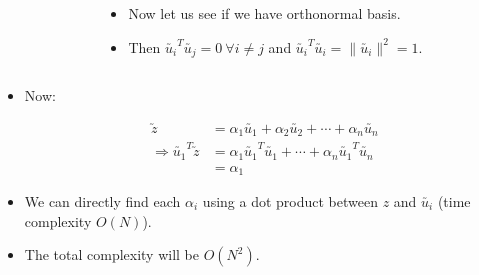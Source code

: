 \documentclass[10pt, aspectratio=169]{beamer}
\begin{document}
\begin{frame}
  \begin{columns}

    \begin{column}{0.5\textwidth}
      \centering
    \end{column}

    \begin{column}{0.5\textwidth}
      \begin{itemize}
        \item<1-> Now let us see if we have orthonormal basis.
        \item<2-> Then $\utilde{u_i}^T \utilde{u_j} = 0 \ \forall i \neq j$ and $\utilde{u_i}^T \utilde{u_i} = \| \utilde{u_i} \|^2 = 1$.
        \end{itemize}
    \end{column}

  \end{columns}
\end{frame}


\begin{frame}
\begin{itemize}
\item<1-> Now:

\begin{align*}
\utilde{z} &= \alpha_1 \utilde{u_1} + \alpha_2 \utilde{u_2} + \cdots + \alpha_n \utilde{u_n} \\ 
\Rightarrow \utilde{u_1}^T \utilde{z} &= \alpha_1 \utilde{u_1}^T \utilde{u_1} + \cdots + \alpha_n \utilde{u_1}^T \utilde{u_n} \\ &= \alpha_1
\end{align*}

\item<2-> We can directly find each \( \alpha_i \) using a dot product between \( z \) and \( \utilde{u_i} \)
(time complexity \( O(N) \)). \\[0.3cm]

\item<3-> The total complexity will be $O(N^2)$.
\end{itemize}
\end{frame}
\end{document}
